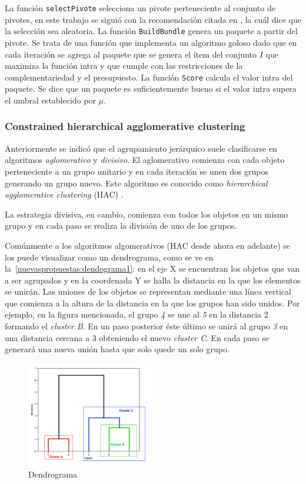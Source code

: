 La función \texttt{selectPivote} selecciona un pivote perteneciente al conjunto de pivotes, en este trabajo se siguió con la recomendación citada en \cite{Zhang:2002:ESI:638644.638646}, la cuál dice que la selección sea aleatoria. La función \texttt{BuildBundle} genera un paquete a partir del pivote. Se trata de una función que implementa un algoritmo goloso dado que en cada iteración se agrega al paquete que se genera el ítem del conjunto $I$ que maximiza la función intra y que cumple con las restricciones de la complementariedad y el presupuesto. La función \texttt{Score} calcula el valor intra del paquete. Se dice que un paquete es suficientemente bueno si el valor intra supera el umbral establecido por $\mu$.

\subsubsection{Constrained hierarchical agglomerative clustering}
Anteriormente se indicó que el agrupamiento jerárquico suele clasificarse en algoritmos \textit{aglomerativo} y \textit{divisivo}. El aglomerativo comienza con cada objeto perteneciente a un grupo unitario y en cada iteración se unen dos grupos generando un grupo nuevo. Este algoritmo es conocido como \textit{hierarchical agglomerative clustering} (HAC) \cite{journals/tkde/Amer-YahiaBCFMZ14}. 

La estrategia divisiva, en cambio, comienza con todos los objetos en un mismo grupo y en cada paso se realiza la división de uno de los grupos.

Comúnmente a los algoritmos algomerativos (HAC desde ahora en adelante) se los puede visualizar como un dendrograma, como se ve en la~\autoref{nuevaspropuestas:dendograma1}: en el eje X se encuentran los objetos que van a ser agrupados y en la coordenada Y se halla la distancia en la que los elementos se unirán. Las uniones de los objetos se representan mediante una línea vertical que comienza a la altura de la distancia en la que los grupos han sido unidos. Por ejemplo, en la figura mencionada, el grupo \textit{4} se une al \textit{5} en la distancia 2 formando el \textit{cluster B}. En un paso posterior éste último se unirá al grupo \textit{3} en una distancia cercana a 3 obteniendo el nuevo \textit{cluster C}. En cada paso se generará una nueva unión hasta que solo quede un solo grupo.

\begin{figure}[H]
  \centering
    \includegraphics[width=0.5\textwidth]{img/dendograma01.png}
  \caption{Dendrograma}
  \label{nuevaspropuestas:dendograma1}
\end{figure}

